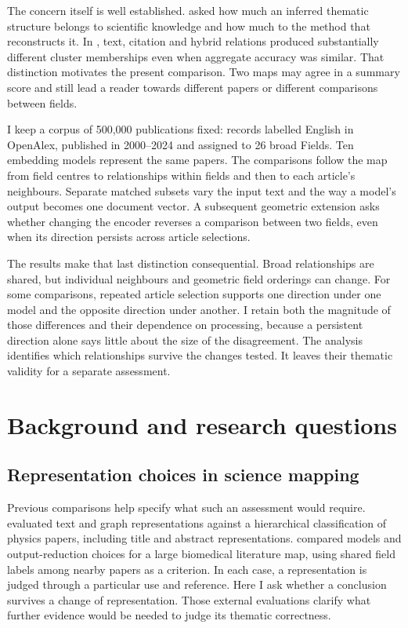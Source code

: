 \documentclass[12pt]{article}
\begin{document}
The concern itself is well established. \citet{refa0d2d707e6} asked how much an inferred thematic structure belongs to scientific knowledge and how much to the method that reconstructs it. In \citet{ref6a2f5912bc}, text, citation and hybrid relations produced substantially different cluster memberships even when aggregate accuracy was similar. That distinction motivates the present comparison. Two maps may agree in a summary score and still lead a reader towards different papers or different comparisons between fields.

I keep a corpus of 500,000 publications fixed: records labelled English in OpenAlex, published in 2000--2024 and assigned to 26 broad Fields. Ten embedding models represent the same papers. The comparisons follow the map from field centres to relationships within fields and then to each article's neighbours. Separate matched subsets vary the input text and the way a model's output becomes one document vector. A subsequent geometric extension asks whether changing the encoder reverses a comparison between two fields, even when its direction persists across article selections.

The results make that last distinction consequential. Broad relationships are shared, but individual neighbours and geometric field orderings can change. For some comparisons, repeated article selection supports one direction under one model and the opposite direction under another. I retain both the magnitude of those differences and their dependence on processing, because a persistent direction alone says little about the size of the disagreement. The analysis identifies which relationships survive the changes tested. It leaves their thematic validity for a separate assessment.

\section{Background and research questions}
\subsection{Representation choices in science mapping}
Previous comparisons help specify what such an assessment would require. \citet{refc0e2cc29e0} evaluated text and graph representations against a hierarchical classification of physics papers, including title and abstract representations. \citet{refbe130e2973} compared models and output-reduction choices for a large biomedical literature map, using shared field labels among nearby papers as a criterion. In each case, a representation is judged through a particular use and reference. Here I ask whether a conclusion survives a change of representation. Those external evaluations clarify what further evidence would be needed to judge its thematic correctness.
\end{document}
